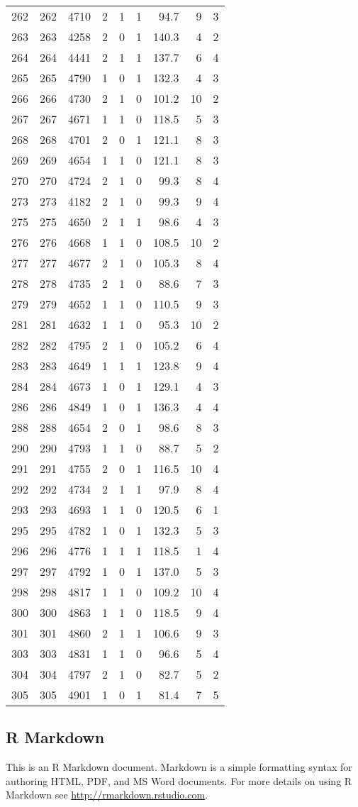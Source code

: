 \documentclass[]{article}
\begin{document}
\begin{longtable}[]{@{}lrrlrrrrr@{}}
262 & 262 & 4710 & 2 & 1 & 1 & 94.7 & 9 & 3\tabularnewline
263 & 263 & 4258 & 2 & 0 & 1 & 140.3 & 4 & 2\tabularnewline
264 & 264 & 4441 & 2 & 1 & 1 & 137.7 & 6 & 4\tabularnewline
265 & 265 & 4790 & 1 & 0 & 1 & 132.3 & 4 & 3\tabularnewline
266 & 266 & 4730 & 2 & 1 & 0 & 101.2 & 10 & 2\tabularnewline
267 & 267 & 4671 & 1 & 1 & 0 & 118.5 & 5 & 3\tabularnewline
268 & 268 & 4701 & 2 & 0 & 1 & 121.1 & 8 & 3\tabularnewline
269 & 269 & 4654 & 1 & 1 & 0 & 121.1 & 8 & 3\tabularnewline
270 & 270 & 4724 & 2 & 1 & 0 & 99.3 & 8 & 4\tabularnewline
273 & 273 & 4182 & 2 & 1 & 0 & 99.3 & 9 & 4\tabularnewline
275 & 275 & 4650 & 2 & 1 & 1 & 98.6 & 4 & 3\tabularnewline
276 & 276 & 4668 & 1 & 1 & 0 & 108.5 & 10 & 2\tabularnewline
277 & 277 & 4677 & 2 & 1 & 0 & 105.3 & 8 & 4\tabularnewline
278 & 278 & 4735 & 2 & 1 & 0 & 88.6 & 7 & 3\tabularnewline
279 & 279 & 4652 & 1 & 1 & 0 & 110.5 & 9 & 3\tabularnewline
281 & 281 & 4632 & 1 & 1 & 0 & 95.3 & 10 & 2\tabularnewline
282 & 282 & 4795 & 2 & 1 & 0 & 105.2 & 6 & 4\tabularnewline
283 & 283 & 4649 & 1 & 1 & 1 & 123.8 & 9 & 4\tabularnewline
284 & 284 & 4673 & 1 & 0 & 1 & 129.1 & 4 & 3\tabularnewline
286 & 286 & 4849 & 1 & 0 & 1 & 136.3 & 4 & 4\tabularnewline
288 & 288 & 4654 & 2 & 0 & 1 & 98.6 & 8 & 3\tabularnewline
290 & 290 & 4793 & 1 & 1 & 0 & 88.7 & 5 & 2\tabularnewline
291 & 291 & 4755 & 2 & 0 & 1 & 116.5 & 10 & 4\tabularnewline
292 & 292 & 4734 & 2 & 1 & 1 & 97.9 & 8 & 4\tabularnewline
293 & 293 & 4693 & 1 & 1 & 0 & 120.5 & 6 & 1\tabularnewline
295 & 295 & 4782 & 1 & 0 & 1 & 132.3 & 5 & 3\tabularnewline
296 & 296 & 4776 & 1 & 1 & 1 & 118.5 & 1 & 4\tabularnewline
297 & 297 & 4792 & 1 & 0 & 1 & 137.0 & 5 & 3\tabularnewline
298 & 298 & 4817 & 1 & 1 & 0 & 109.2 & 10 & 4\tabularnewline
300 & 300 & 4863 & 1 & 1 & 0 & 118.5 & 9 & 4\tabularnewline
301 & 301 & 4860 & 2 & 1 & 1 & 106.6 & 9 & 3\tabularnewline
303 & 303 & 4831 & 1 & 1 & 0 & 96.6 & 5 & 4\tabularnewline
304 & 304 & 4797 & 2 & 1 & 0 & 82.7 & 5 & 2\tabularnewline
305 & 305 & 4901 & 1 & 0 & 1 & 81.4 & 7 & 5\tabularnewline
\bottomrule
\end{longtable}

\subsection{R Markdown}\label{r-markdown}

This is an R Markdown document. Markdown is a simple formatting syntax
for authoring HTML, PDF, and MS Word documents. For more details on
using R Markdown see \url{http://rmarkdown.rstudio.com}.
\end{document}
